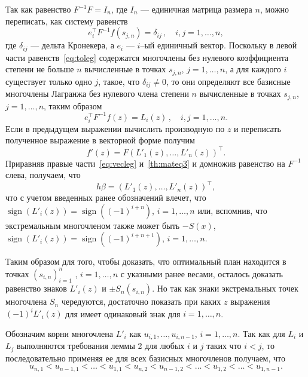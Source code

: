 \documentclass[specialist,
               substylefile = spbu.rtx,
               subf,href,colorlinks=true, 12pt]{disser}
\theoremstyle{definition}
\DeclareMathOperator*{\sign}{sign}
\begin{document}
	Так как равенство $F^{-1}F = I_n$, где $I_n$ --- единичная матрица размера $n$, можно переписать, как систему равенств
	\begin{equation}
		\label{eq:toleg}
		e_i^{\top} F^{-1} f(s_{j,n}) = \delta_{ij} \, , \quad i, j = 1, \ldots , n ,
	\end{equation}
	где $\delta_{ij}$ --- дельта Кронекера, а $e_i$ --- $i$--ый единичный вектор. Поскольку в левой части равенств~\eqref{eq:toleg} содержатся многочлены без нулевого коэффициента степени не больше $n$ вычисленные в точках $s_{j, n}$, $j=1, \ldots , n$, а для каждого $i$ существует только одно $j$, такое, что $\delta_{ij} \neq 0$, то они определяют все базисные многочлены Лагранжа без нулевого члена степени $n$ вычисленные в точках $s_{j, n}$, $j=1, \ldots , n$, таким образом
	\begin{equation}
		\label{eq:leg}
		e_i^{\top} F^{-1} f(z) = L_i(z) \, , \quad i, j = 1, \ldots , n .
	\end{equation}
	Если в предыдущем выражении вычислить производную по $z$ и переписать полученное выражение в векторной форме получим
	\begin{equation}
		\label{eq:vecleg}
		f'(z) = F \left( L'_1(z), \ldots, L'_n(z) \right)^\top.
	\end{equation}
	Приравняв правые части~\eqref{eq:vecleg} и~\eqref{th:mateq3} и домножив равенство на $F^{-1}$ слева, получаем, что
	\begin{equation}
		\label{eq:vecleg}
		h \beta = \left( L'_1(z), \ldots, L'_n(z) \right)^\top,
	\end{equation}
	что с учетом введенных ранее обозначений влечет, что $\sign (L'_i(z)) = \sign((-1)^{i+n}) $, $i = 1, \ldots, n$ или, вспомнив, что экстремальным многочленом также может быть $-S(x)$,  $\sign (L'_i(z)) = \sign((-1)^{i+n+1}) $, $i = 1, \ldots, n$.
	
	Таким образом для того, чтобы доказать, что оптимальный план находится в точках $(s_{i, n})_{i=1}^n$ , $i = 1, \ldots, n$ с указными ранее весами, осталось доказать равенство знаков $L'_i(z)$ и $\pm S_n(s_{i, n})$. Но так как знаки экстремальных точек многочлена $S_n$ чередуются, достаточно показать при каких $z$ выражения $(-1)^i L'_i(z)$ для имеет одинаковый знак для $i=1,\ldots , n$.
	
	Обозначим корни многочлена $L'_i$ как $u_{i,1}, \ldots, u_{i,n-1}$, $i = 1, \ldots, n$. Так как для $L_i$ и $L_j$ выполняются требования леммы 2 для любых $i$ и $j$ таких что $i < j$, то последовательно применяя ее для всех базисных многочленов получаем, что
	\begin{equation}
	\label{eq:droots}
		u_{n, 1} < u_{n-1, 1} < \ldots < u_{1, 1} < u_{n, 2} < u_{n-1, 2} < \ldots < u_{1, 2} < \ldots < u_{1, n-1}.
	\end{equation}
	
\end{document}
